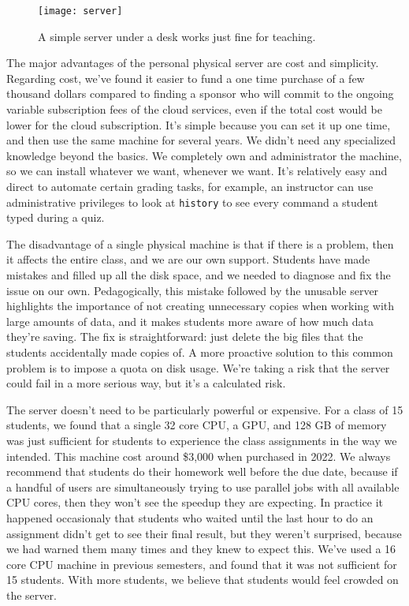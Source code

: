 \documentclass[12pt]{article}
\begin{document}
\begin{figure}[h]
    \centering
    \texttt{[image: server]}
    \caption{A simple server under a desk works just fine for teaching.}
    \label{fig:server}
\end{figure}

The major advantages of the personal physical server are cost and simplicity.
Regarding cost, we've found it easier to fund a one time purchase of a few thousand dollars compared to finding a sponsor who will commit to the ongoing variable subscription fees of the cloud services, even if the total cost would be lower for the cloud subscription.
It's simple because you can set it up one time, and then use the same machine for several years.
We didn't need any specialized knowledge beyond the basics.
We completely own and administrator the machine, so we can install whatever we want, whenever we want.
It's relatively easy and direct to automate certain grading tasks, for example, an instructor can use administrative privileges to look at \texttt{history} to see every command a student typed during a quiz.

The disadvantage of a single physical machine is that if there is a problem, then it affects the entire class, and we are our own support.
Students have made mistakes and filled up all the disk space, and we needed to diagnose and fix the issue on our own.
Pedagogically, this mistake followed by the unusable server highlights the importance of not creating unnecessary copies when working with large amounts of data, and it makes students more aware of how much data they're saving.
The fix is straightforward: just delete the big files that the students accidentally made copies of.
A more proactive solution to this common problem is to impose a quota on disk usage.
We're taking a risk that the server could fail in a more serious way, but it's a calculated risk.


The server doesn't need to be particularly powerful or expensive.
For a class of 15 students, we found that a single 32 core CPU, a GPU, and 128 GB of memory was just sufficient for students to experience the class assignments in the way we intended.
This machine cost around \$3,000 when purchased in 2022.
We always recommend that students do their homework well before the due date, because if a handful of users are simultaneously trying to use parallel jobs with all available CPU cores, then they won't see the speedup they are expecting.
In practice it happened occasionaly that students who waited until the last hour to do an assignment didn't get to see their final result, but they weren't surprised, because we had warned them many times and they knew to expect this.
We've used a 16 core CPU machine in previous semesters, and found that it was not sufficient for 15 students.
With more students, we believe that students would feel crowded on the server.
\end{document}
